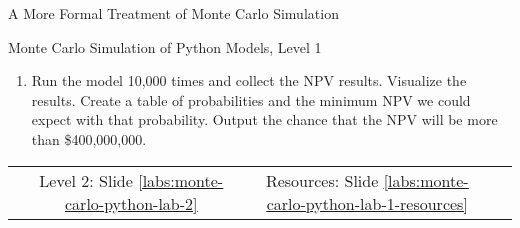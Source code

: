 \documentclass[handout, 11pt]{beamer}
\begin{document}
\begin{section}[Formal MC]{A More Formal Treatment of Monte Carlo Simulation}
\begin{frame}
{\begin{block}{Monte Carlo Simulation of Python Models, Level 1}
\begin{enumerate}
\item Run the model 10,000 times and collect the NPV results. Visualize the results. Create a table of probabilities and the minimum NPV we could expect with that probability. Output the chance that the NPV will be more than \$400,000,000.
\end{enumerate}
\vfill
\begin{tabular*}{\textwidth}{@{\extracolsep{\fill}}cccc}
\toprule
\hfill & Level 2: Slide \textcolor{blue}{\underline{\ref{labs:monte-carlo-python-lab-2}}} & Resources: Slide \textcolor{blue}{\underline{\ref{labs:monte-carlo-python-lab-1-resources}}} & \hfill\\

\end{tabular*}
\end{block}
}
\label{labs:monte-carlo-python-lab-1}
\end{frame}
\end{section}
\end{document}
